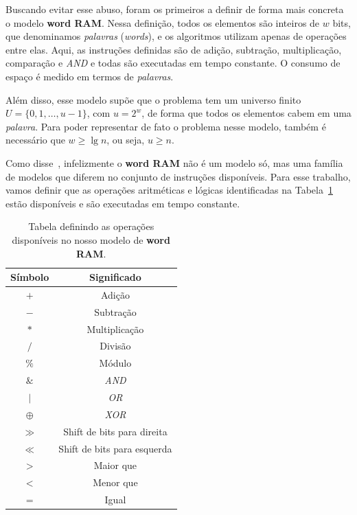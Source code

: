 Buscando evitar esse abuso, \cite{FrWi93} foram os primeiros a definir de forma
mais concreta o modelo \textbf{word RAM}. Nessa definição, todos os elementos
são inteiros de $w$ bits, que denominamos \textit{palavras} (\textit{words}), e
os algoritmos utilizam apenas de operações entre elas. Aqui, as instruções
definidas são de adição, subtração, multiplicação, comparação e \textit{AND} e
todas são executadas em tempo constante. O consumo de espaço é medido em termos
de \textit{palavras}. 

Além disso, esse modelo supõe que o problema tem um universo finito
$U=\{0,1,\dots,u-1\}$, com $u=2^w$, de forma que todos os elementos cabem em uma
\textit{palavra}. Para poder representar de fato o problema nesse modelo, também
é necessário que $w \geq \lg n$, ou seja, $u \geq n$.

Como disse~\cite{HT98}, infelizmente o \textbf{word RAM} não é um modelo só, mas
uma família de modelos que diferem no conjunto de instruções disponíveis. Para
esse trabalho, vamos definir que as operações aritméticas e lógicas
identificadas na Tabela~\ref{t:word-ram-operations} estão disponíveis e são
executadas em tempo constante. 

\begin{table}[htbp]
    \centering
    \begin{tabular}{|c|c|}
        \hline
        \textbf{Símbolo} & \textbf{Significado} \\
        \hline
        $+$ & Adição \\ \hline
        $-$ & Subtração \\ \hline
        $*$ & Multiplicação \\ \hline
        $/$ & Divisão \\ \hline
        $\%$ & Módulo \\ \hline
        $\&$ & \textit{AND} \\ \hline
        $\mid$ & \textit{OR} \\ \hline
        $\oplus$ & \textit{XOR} \\ \hline 
        $\gg$ & Shift de bits para direita \\ \hline
        $\ll$ & Shift de bits para esquerda \\ \hline
        $>$ & Maior que \\ \hline
        $<$ & Menor que \\ \hline
        $=$ & Igual \\ \hline
    \end{tabular}
    \caption{Tabela definindo as operações disponíveis no nosso modelo de
    \textbf{word RAM}.\label{t:word-ram-operations}} 
\end{table}

